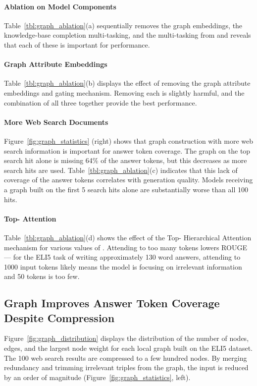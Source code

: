 \documentclass[11pt,a4paper]{article}
\begin{document}
\paragraph{Ablation on Model Components} Table~\ref{tbl:graph_ablation}(a) sequentially removes the graph embeddings, the knowledge-base completion multi-tasking, and the multi-tasking from \cite{fan2019explain} and reveals that each of these is important for performance. 

\paragraph{Graph Attribute Embeddings} Table~\ref{tbl:graph_ablation}(b) displays the effect of removing the graph attribute embeddings and gating mechanism. Removing each is slightly harmful, and the combination of all three together provide the best performance. 

\paragraph{More Web Search Documents} Figure~\ref{fig:graph_statistics} (right) shows that graph construction with more web search information is important for answer token coverage. The graph on the top search hit alone is missing 64\% of the answer tokens, but this decreases as more search hits are used.  Table~\ref{tbl:graph_ablation}(c) indicates that this lack of coverage of the answer tokens correlates with generation quality. Models receiving a graph built on the first 5 search hits alone are substantially worse than all 100  hits.

\paragraph{Top- Attention} Table~\ref{tbl:graph_ablation}(d) shows the effect of the Top- Hierarchical Attention mechanism for various values of . Attending to too many tokens lowers ROUGE --- for the ELI5 task of writing approximately 130 word answers, attending to 1000 input tokens likely means the model is focusing on irrelevant information and 50 tokens is too few.

\subsection{Graph Improves Answer Token Coverage Despite Compression}

Figure~\ref{fig:graph_distribution} displays the distribution of the number of nodes, edges, and the largest node weight for each local graph built on the ELI5 dataset. The 100 web search results are compressed to a few hundred nodes. By merging redundancy and trimming irrelevant triples from the graph, the input is reduced by an order of magnitude (Figure~\ref{fig:graph_statistics}, left). 
\end{document}
